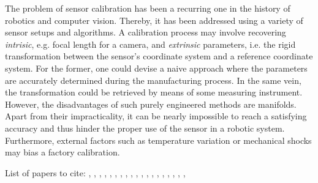 The problem of sensor calibration has been a recurring one in the history of
robotics and computer vision. Thereby, it has been addressed using a
variety of sensor setups and algorithms. A calibration process may involve
recovering \emph{intrisic}, e.g. focal length for a camera, and \emph{extrinsic}
parameters, i.e. the rigid transformation between the sensor's coordinate system
and a reference coordinate system. For the former, one could devise a naive
approach where the parameters are accurately determined during the manufacturing
process. In the same vein, the transformation could be retrieved by means of
some measuring instrument. However, the disadvantages of such purely
engineered methods are manifolds. Apart from their impracticality, it can be
nearly impossible to reach a satisfying accuracy and thus hinder the proper use
of the sensor in a robotic system. Furthermore, external factors such as
temperature variation or mechanical shocks may bias a factory calibration.

List of papers to cite: \cite{davis11algorithm},
\cite{brookshire12extrinsic}, \cite{aster11parameter}, \cite{brookshire11automatic},
\cite{chan94lowrank}, \cite{finsterle11truncated}, \cite{golub96matrix},
\cite{hansen87truncated}, \cite{hong92rank}, \cite{jauffret07observability},
\cite{kitagawa01regularization}, \cite{levinson10unsupervised},
\cite{mackay05information}, \cite{maddern12lost}, \cite{martinelli06automatic},
\cite{sheehan12self}, \cite{sheehan10automatic}, \cite{zhang04extrinsic},
\cite{gao10online}, \cite{hol10modeling}
